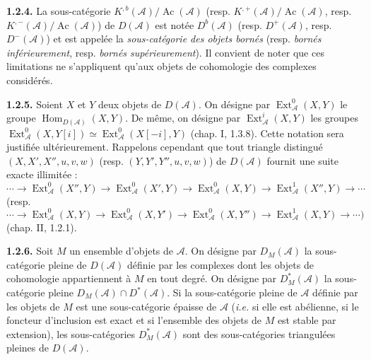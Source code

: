 \clearpage
{}%
\begingroup\small\setlength{\parskip}{0pt}\setlength{\emergencystretch}{1.5em}
\setlength{\abovedisplayskip}{4pt plus 2pt minus 2pt}%
\setlength{\belowdisplayskip}{4pt plus 2pt minus 2pt}%

\noindent\textbf{1.2.4.}\quad
La sous-catégorie $K^{,b}(\mathcal A)/\operatorname{Ac}(\mathcal A)$
(resp. $K^{,+}(\mathcal A)/\operatorname{Ac}(\mathcal A)$, resp.
$K^{,-}(\mathcal A)/\operatorname{Ac}(\mathcal A)$) de $D(\mathcal A)$
est notée $D^b(\mathcal A)$ (resp. $D^+(\mathcal A)$, resp.
$D^-(\mathcal A)$) et est appelée la \emph{sous-catégorie des objets
bornés} (resp. \emph{bornés inférieurement}, resp. \emph{bornés
supérieurement}). Il convient de noter que ces limitations ne s'appliquent
qu'aux objets de cohomologie des complexes considérés.

\medskip\noindent\textbf{1.2.5.}\quad
Soient $X$ et $Y$ deux objets de $D(\mathcal A)$. On désigne par
$\operatorname{Ext}_{\mathcal A}^{0}(X,Y)$ le groupe
$\operatorname{Hom}_{D(\mathcal A)}(X,Y)$. De même, on désigne par
$\operatorname{Ext}_{\mathcal A}^{i}(X,Y)$ les groupes
$\operatorname{Ext}_{\mathcal A}^{0}(X,Y[i])\simeq
\operatorname{Ext}_{\mathcal A}^{0}(X[-i],Y)$ (chap. I, 1.3.8). Cette
notation sera justifiée ultérieurement. Rappelons cependant que tout triangle
distingué $(X,X',X'',u,v,w)$ (resp. $(Y,Y',Y'',u,v,w)$) de $D(\mathcal A)$
fournit une suite exacte illimitée :
\[
\cdots\longrightarrow \operatorname{Ext}_{\mathcal A}^{0}(X'',Y)
\longrightarrow \operatorname{Ext}_{\mathcal A}^{0}(X',Y)
\longrightarrow \operatorname{Ext}_{\mathcal A}^{0}(X,Y)
\longrightarrow \operatorname{Ext}_{\mathcal A}^{1}(X'',Y)
\longrightarrow\cdots
\]
(resp.
\[
\cdots\longrightarrow \operatorname{Ext}_{\mathcal A}^{0}(X,Y)
\longrightarrow \operatorname{Ext}_{\mathcal A}^{0}(X,Y')
\longrightarrow \operatorname{Ext}_{\mathcal A}^{0}(X,Y'')
\longrightarrow \operatorname{Ext}_{\mathcal A}^{1}(X,Y)
\longrightarrow\cdots )
\]
(chap. II, 1.2.1).

\medskip\noindent\textbf{1.2.6.}\quad
Soit $M$ un ensemble d'objets de $\mathcal A$. On désigne par
$D_M(\mathcal A)$ la sous-catégorie pleine de $D(\mathcal A)$ définie par
les complexes dont les objets de cohomologie appartiennent à $M$ en tout
degré. On désigne par $D_M^*(\mathcal A)$ la sous-catégorie pleine
$D_M(\mathcal A)\cap D^*(\mathcal A)$. Si la sous-catégorie pleine de
$\mathcal A$ définie par les objets de $M$ est une sous-catégorie épaisse de
$\mathcal A$ (\textit{i.e.} si elle est abélienne, si le foncteur
d'inclusion est exact et si l'ensemble des objets de $M$ est stable par
extension), les sous-catégories $D_M^*(\mathcal A)$ sont des
sous-catégories triangulées pleines de $D(\mathcal A)$.

